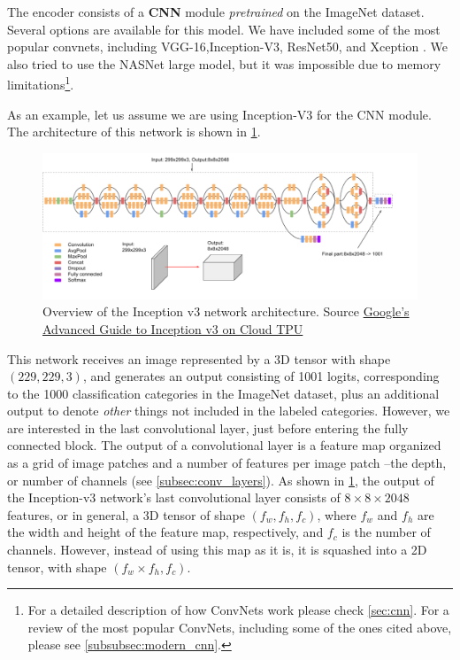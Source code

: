 The encoder consists of a \textbf{CNN} module \textit{pretrained} on the ImageNet dataset. Several options are available for this model. We have included some of the most popular convnets, including VGG-16\citep{Simonyan2015},Inception-V3\citep{Szegedy2016}, ResNet50\citep{He2016resnet}, and Xception \citep{Chollet2017}. We also tried to use the NASNet \citep{Zoph2018} large model, but it was impossible due to memory limitations\footnote{For a detailed description of how ConvNets work please check \cref{sec:cnn}. For a review of the most popular ConvNets, including some of the ones cited above, please see \cref{subsubsec:modern_cnn}.}.

As an example, let us assume we are using Inception-V3 for the CNN module. The architecture of this network is shown in \cref{fig:inceptionv3}.

\begin{figure}[hpt]
	\centering
	\includegraphics[scale=0.5]{images/ch4/inceptionv3.png}
	\caption{Overview of the Inception v3 network architecture. Source \href{https://cloud.google.com/tpu/docs/inception-v3-advanced}{Google's Advanced Guide to Inception v3 on Cloud TPU}}
	\label{fig:inceptionv3}
\end{figure}

This network receives an image represented by a 3D tensor with shape $(229, 229, 3)$, and generates an output consisting of 1001 logits, corresponding to the 1000 classification categories in the ImageNet dataset, plus an additional output to denote \textit{other} things not included in the labeled categories. However, we are interested in the last convolutional layer, just before entering the fully connected block. The output of a convolutional layer is a feature map organized as a grid of image patches and a number of features per image patch --the depth, or number of channels (see \cref{subsec:conv_layers}). As shown in \cref{fig:inceptionv3}, the output of the Inception-v3 network's last convolutional layer consists of $8 \times 8 \times 2048$ features, or in general, a 3D tensor of shape $(f_w, f_h, f_c)$, where $f_w$ and $f_h$ are the width and height of the feature map, respectively, and $f_c$ is the number of channels. However, instead of using this map as it is, it is squashed into a 2D tensor, with shape $(f_w \times f_h, f_c)$.

